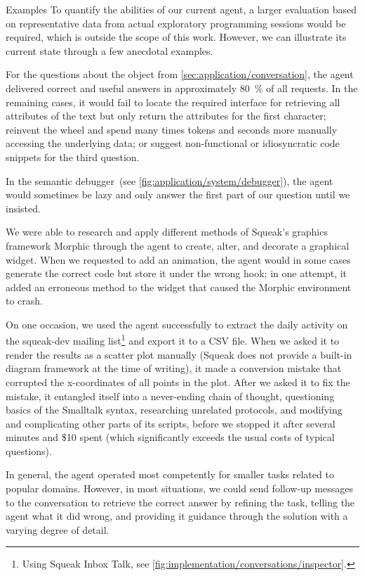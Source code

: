 \begin{genericbox}{Examples}
	To quantify the abilities of our current agent, a larger evaluation based on representative data from actual exploratory programming sessions would be required, which is outside the scope of this work.
	However, we can illustrate its current state through a few anecdotal examples.

	For the questions about the  object from \cref{sec:application/conversation}, the agent delivered correct and useful answers in approximately \qty{80}{\percent} of all requests.
	In the remaining cases, it would fail to locate the required interface for retrieving all attributes of the text but only return the attributes for the first character; reinvent the wheel and spend many times tokens and seconds more manually accessing the underlying data; or suggest non-functional or idiosyncratic code snippets for the third question.

	In the semantic debugger~(see \cref{fig:application/system/debugger}), the agent would sometimes be lazy and only answer the first part of our question until we insisted.

	We were able to research and apply different methods of Squeak's graphics framework Morphic through the agent to create, alter, and decorate a graphical widget.
	When we requested to add an animation, the agent would in some cases generate the correct code but store it under the wrong hook; in one attempt, it added an erroneous method to the widget that caused the Morphic environment to crash.

	On one occasion, we used the agent successfully to extract the daily activity on the squeak-dev mailing list\footnote{Using Squeak Inbox Talk, see \cref{fig:implementation/conversations/inspector}.} and export it to a CSV file.
	When we asked it to render the results as a scatter plot manually (Squeak does not provide a built-in diagram framework at the time of writing), it made a conversion mistake that corrupted the x-coordinates of all points in the plot.
	After we asked it to fix the mistake, it entangled itself into a never-ending chain of thought, questioning basics of the Smalltalk syntax, researching unrelated protocols, and modifying and complicating other parts of its scripts, before we stopped it after several minutes and \$10 spent (which significantly exceeds the usual costs of typical questions).
\end{genericbox}

In general, the agent operated most competently for smaller tasks related to popular domains.
However, in most situations, we could send follow-up messages to the conversation to retrieve the correct answer by refining the task, telling the agent what it did wrong, and providing it guidance through the solution with a varying degree of detail.

